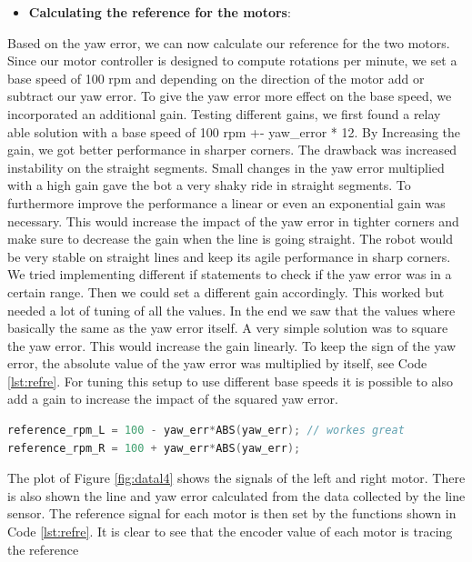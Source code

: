\documentclass[english]{article}
\begin{document}
\begin{itemize}
    \item \textbf{Calculating the reference for the motors}: 
\end{itemize}
Based on the yaw error, we can now calculate our reference for the two motors.
Since our motor controller is designed to compute rotations per minute, we set 
a base speed of 100 rpm and depending on the direction of the motor add or subtract
our yaw error. To give the yaw error more effect on the base speed, we incorporated
an additional gain. Testing different gains, we first found a relay able solution with
a base speed of 100 rpm +- yaw\_error * 12. By Increasing the gain, we got better 
performance in sharper corners. The drawback was increased instability
 on the straight segments. Small changes in the yaw error multiplied with 
 a high gain gave the bot a very shaky ride in straight segments. To furthermore 
 improve the performance a linear or even an exponential gain was necessary. 
 This would increase the impact of the yaw error in tighter corners and make 
 sure to decrease the gain when the line is going straight. The robot would 
 be very stable on straight lines and keep its agile performance in sharp corners. 
 We tried implementing different if statements to check if the yaw error was in
  a certain range. Then we could set a different gain accordingly. This worked 
  but needed a lot of tuning of all the values. In the end we saw that the values
   where basically the same as the yaw error itself.  
 A very simple solution was to square the yaw error.
  This would increase the gain linearly. To keep the
   sign of the yaw error, the absolute value of the yaw 
   error was multiplied by itself, see Code \ref{lst:refre}. For tuning
    this setup to use different base speeds it is possible to
     also add a gain to increase the impact of the squared yaw error.   
\begin{lstlisting}[language=C, caption={Calculating the reference signals for the motors}, label={lst:refre} ]
reference_rpm_L = 100 - yaw_err*ABS(yaw_err); // workes great 
reference_rpm_R = 100 + yaw_err*ABS(yaw_err);
\end{lstlisting}
\newpage
The plot of Figure \ref{fig:datal4} shows the signals of the left and right motor. There is also 
shown the line and yaw error calculated from the data collected by the line sensor.
The reference signal for each motor is then set by the functions shown in Code \ref{lst:refre}.
It is clear to see that the encoder value of each motor is tracing the reference 
\end{document}
